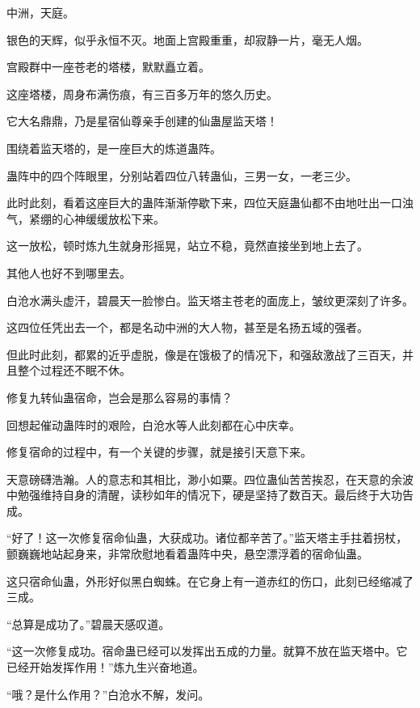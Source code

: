 
\begin{this_body}



中洲，天庭。

银色的天辉，似乎永恒不灭。地面上宫殿重重，却寂静一片，毫无人烟。

宫殿群中一座苍老的塔楼，默默矗立着。

这座塔楼，周身布满伤痕，有三百多万年的悠久历史。

它大名鼎鼎，乃是星宿仙尊亲手创建的仙蛊屋监天塔！

围绕着监天塔的，是一座巨大的炼道蛊阵。

蛊阵中的四个阵眼里，分别站着四位八转蛊仙，三男一女，一老三少。

此时此刻，看着这座巨大的蛊阵渐渐停歇下来，四位天庭蛊仙都不由地吐出一口浊气，紧绷的心神缓缓放松下来。

这一放松，顿时炼九生就身形摇晃，站立不稳，竟然直接坐到地上去了。

其他人也好不到哪里去。

白沧水满头虚汗，碧晨天一脸惨白。监天塔主苍老的面庞上，皱纹更深刻了许多。

这四位任凭出去一个，都是名动中洲的大人物，甚至是名扬五域的强者。

但此时此刻，都累的近乎虚脱，像是在饿极了的情况下，和强敌激战了三百天，并且整个过程还不眠不休。

修复九转仙蛊宿命，岂会是那么容易的事情？

回想起催动蛊阵时的艰险，白沧水等人此刻都在心中庆幸。

修复宿命的过程中，有一个关键的步骤，就是接引天意下来。

天意磅礴浩瀚。人的意志和其相比，渺小如粟。四位蛊仙苦苦挨忍，在天意的余波中勉强维持自身的清醒，读秒如年的情况下，硬是坚持了数百天。最后终于大功告成。

“好了！这一次修复宿命仙蛊，大获成功。诸位都辛苦了。”监天塔主手拄着拐杖，颤巍巍地站起身来，非常欣慰地看着蛊阵中央，悬空漂浮着的宿命仙蛊。

这只宿命仙蛊，外形好似黑白蜘蛛。在它身上有一道赤红的伤口，此刻已经缩减了三成。

“总算是成功了。”碧晨天感叹道。

“这一次修复成功。宿命蛊已经可以发挥出五成的力量。就算不放在监天塔中。它已经开始发挥作用！”炼九生兴奋地道。

“哦？是什么作用？”白沧水不解，发问。


\end{this_body}
